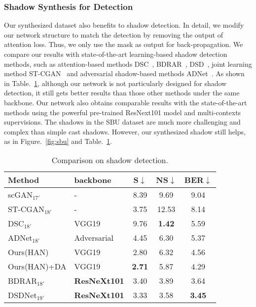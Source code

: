\documentclass[letterpaper]{article} \usepackage{aaai20}  \usepackage{times}  \usepackage{helvet} \usepackage{courier}  \usepackage[hyphens]{url}  \urlstyle{rm} \def\UrlFont{\rm}  \usepackage{graphicx}  \frenchspacing  \setlength{\pdfpagewidth}{8.5in}  \setlength{\pdfpageheight}{11in}  \usepackage{amssymb}
\begin{document}
 





\subsubsection{Shadow Synthesis for Detection} Our synthesized dataset also benefits to shadow detection. In detail, we modify our network structure to match the detection by removing the output of attention loss. Thus, we only use the mask as output for back-propagation. We compare our results with state-of-the-art learning-based shadow detection methods, such as attention-based methods DSC~\cite{Hu:2018wd}, BDRAR~\cite{zhu2018bidirectional}, DSD~\cite{zheng2019distraction}, joint learning method ST-CGAN~\cite{wang2018stacked} and adversarial shadow-based methods ADNet~\cite{Le:2018vu}. As shown in Table.~\ref{table:detection}, although our network is not particularly designed for shadow detection, it still gets better results than those other methods under the same backbone. Our network also obtains comparable results with the state-of-the-art methods using the powerful pre-trained ResNext101 model and multi-contexts supervisions. The shadows in the SBU dataset are much more challenging and complex than simple cast shadows. However, our synthesized shadow still helps, as in Figure.~\ref{fig:sbu} and Table.~\ref{table:detection}. 

\begin{table}[t]
\caption{Comparison on shadow detection.}
\label{table:detection}
\begin{center}
\begin{tabular}{|l|l|c|c|c|}
\hline
Method & backbone & S$\downarrow$ & NS$\downarrow$ & BER$\downarrow$  \\
\hline
\hline
scGAN$_{17'}$ & - &  8.39 & 9.69 & 9.04 \\
ST-CGAN$_{18'}$ & - & 3.75 & 12.53 & 8.14   \\
DSC$_{18'}$  &   VGG19    & 9.76  & \textbf{1.42} & 5.59   \\
ADNet$_{18'}$  & Adversarial &  4.45  &  6.30  & 5.37  \\
Ours(HAN)   &  VGG19 & 2.80 & 6.32 & 4.56 \\ 
Ours(HAN)+DA   &  VGG19 & \textbf{2.71} & 5.87 & 4.29 \\ 
\hline
BDRAR$_{18'}$  & \textbf{ResNeXt101} &  3.40 &  3.89  & 3.64 \\
DSDNet$_{19'}$  & \textbf{ResNeXt101} &  3.33  & 3.58    & \textbf{3.45} \\
\hline
\end{tabular}
\end{center}
\end{table}
\end{document}
